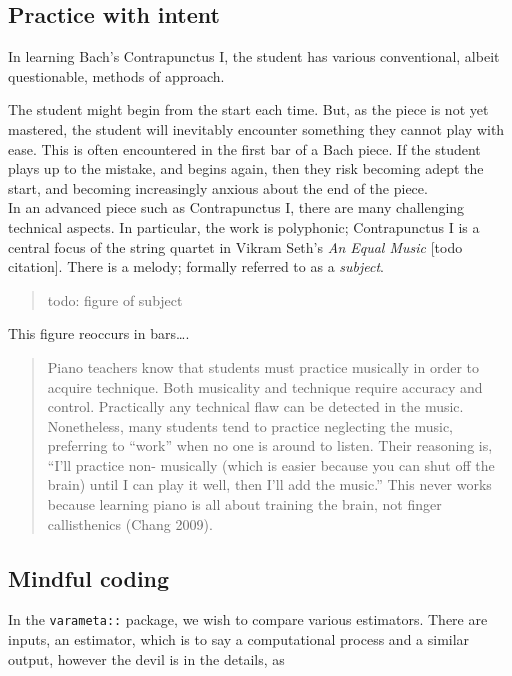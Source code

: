 \documentclass[
]{article}
\begin{document}
\hypertarget{practice-with-intent}{%
\subsection{Practice with intent}\label{practice-with-intent}}

In learning Bach's Contrapunctus I, the student has various
conventional, albeit questionable, methods of approach.

The student might begin from the start each time. But, as the piece is
not yet mastered, the student will inevitably encounter something they
cannot play with ease. This is often encountered in the first bar of a
Bach piece. If the student plays up to the mistake, and begins again,
then they risk becoming adept the start, and becoming increasingly
anxious about the end of the piece.\\
In an advanced piece such as Contrapunctus I, there are many challenging
technical aspects. In particular, the work is polyphonic; Contrapunctus
I is a central focus of the string quartet in Vikram Seth's \emph{An
Equal Music} {[}todo citation{]}. There is a melody; formally referred
to as a \emph{subject}.

\begin{quote}
todo: figure of subject
\end{quote}

This figure reoccurs in bars\ldots.

\begin{quote}
Piano teachers know that students must practice musically in order to
acquire technique. Both musicality and technique require accuracy and
control. Practically any technical flaw can be detected in the music.
Nonetheless, many students tend to practice neglecting the music,
preferring to ``work'' when no one is around to listen. Their reasoning
is, ``I'll practice non- musically (which is easier because you can shut
off the brain) until I can play it well, then I'll add the music.'' This
never works because learning piano is all about training the brain, not
finger callisthenics (Chang 2009).
\end{quote}

\hypertarget{mindful-coding}{%
\subsection{Mindful coding}\label{mindful-coding}}

In the \texttt{varameta::} package, we wish to compare various
estimators. There are inputs, an estimator, which is to say a
computational process and a similar output, however the devil is in the
details, as
\end{document}
